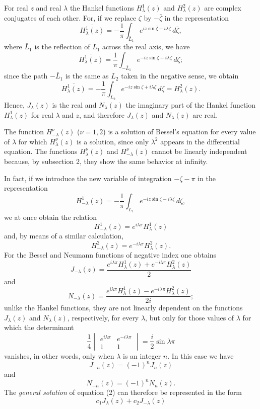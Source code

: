 For real $z$ and real $\lambda$ the Hankel functions $H_\lambda^1(z)$ and $H_\lambda^2(z)$ are complex conjugates of each other. For, if we replace $\zeta$ by $-\bar\zeta$ in the representation
\[
\overline{H_\lambda^1(z)}=-\frac1\pi\int_{\bar L_1}e^{iz\sin\bar\zeta-i\lambda\bar\zeta}\,d\bar\zeta,
\]
where $\bar L_1$ is the reflection of $L_1$ across the real axis, we have
\[
\overline{H_\lambda^1(z)}=\frac1\pi\int_{-\bar L_1}e^{-iz\sin\zeta+i\lambda\zeta}\,d\zeta;
\]
since the path $-\bar L_1$ is the same as $L_2$ taken in the negative sense, we obtain
\[
\overline{H_\lambda^1(z)}=-\frac1\pi\int_{L_2}e^{-iz\sin\zeta+i\lambda\zeta}\,d\zeta=H_\lambda^2(z).
\]
Hence, $J_\lambda(z)$ is the real and $N_\lambda(z)$ the imaginary part of the Hankel function $H_\lambda^1(z)$ for real $\lambda$ and $z$, and therefore $J_\lambda(z)$ and $N_\lambda(z)$ are real.

The function $H_{-\lambda}^\nu(z)$ ($\nu=1,2$) is a solution of Bessel's equation for every value of $\lambda$ for which $H_\lambda^\nu(z)$ is a solution, since only $\lambda^2$ appears in the differential equation. The functions $H_\lambda^\nu(z)$ and $H_{-\lambda}^\nu(z)$ cannot be linearly independent because, by subsection 2, they show the same behavior at infinity.

In fact, if we introduce the new variable of integration $-\zeta-\pi$ in the representation
\[
H_{-\lambda}^1(z)=-\frac1\pi\int_{L_1}e^{-iz\sin\zeta-i\lambda\zeta}\,d\zeta,
\]
we at once obtain the relation
\begin{equation}\tag{6}
H_{-\lambda}^1(z)=e^{i\lambda\pi}H_\lambda^1(z)
\end{equation}
and, by means of a similar calculation,
\begin{equation}\tag{6'}
H_{-\lambda}^2(z)=e^{-i\lambda\pi}H_\lambda^2(z).
\end{equation}
For the Bessel and Neumann functions of negative index one obtains
\begin{equation}\tag{7}
J_{-\lambda}(z)=\frac{e^{i\lambda\pi}H_\lambda^1(z)+e^{-i\lambda\pi}H_\lambda^2(z)}{2}
\end{equation}
and
\begin{equation}\tag{7'}
N_{-\lambda}(z)=\frac{e^{i\lambda\pi}H_\lambda^1(z)-e^{-i\lambda\pi}H_\lambda^2(z)}{2i};
\end{equation}
unlike the Hankel functions, they are not linearly dependent on the functions $J_\lambda(z)$ and $N_\lambda(z)$, respectively, for every $\lambda$, but only for those values of $\lambda$ for which the determinant
\[
\frac14\begin{vmatrix}
e^{i\lambda\pi}&e^{-i\lambda\pi}\\
1&1
\end{vmatrix}=\frac i2\sin\lambda\pi
\]
vanishes, in other words, only when $\lambda$ is an integer $n$. In this case we have
\begin{equation}\tag{8}
J_{-n}(z)=(-1)^nJ_n(z)
\end{equation}
and
\begin{equation}\tag{8'}
N_{-n}(z)=(-1)^nN_n(z).
\end{equation}
The \emph{general solution} of equation (2) can therefore be represented in the form
\[
c_1J_\lambda(z)+c_2J_{-\lambda}(z)
\]

